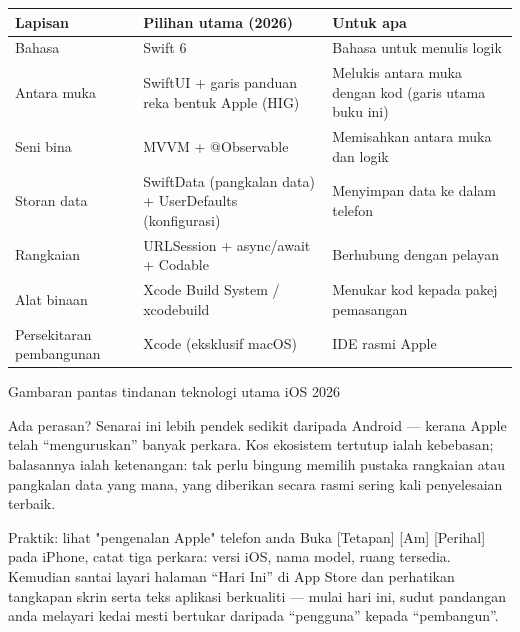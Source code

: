 
\begin{center}
\begin{tabularx}{\linewidth}{|X|X|X|}
\hline
\textbf{Lapisan} & \textbf{Pilihan utama (2026)} & \textbf{Untuk apa} \tabularnewline
\hline
Bahasa & Swift 6 & Bahasa untuk menulis logik \tabularnewline
Antara muka & SwiftUI + garis panduan reka bentuk Apple (HIG) & Melukis antara muka dengan kod (garis utama buku ini) \tabularnewline
Seni bina & MVVM + @Observable & Memisahkan antara muka dan logik \tabularnewline
Storan data & SwiftData (pangkalan data) + UserDefaults (konfigurasi) & Menyimpan data ke dalam telefon \tabularnewline
Rangkaian & URLSession + async/await + Codable & Berhubung dengan pelayan \tabularnewline
Alat binaan & Xcode Build System / xcodebuild & Menukar kod kepada pakej pemasangan \tabularnewline
Persekitaran pembangunan & Xcode (eksklusif macOS) & IDE rasmi Apple \tabularnewline
\hline
\end{tabularx}
\end{center}

\begin{center}\small\color{gray}Gambaran pantas tindanan teknologi utama iOS 2026\end{center}

Ada perasan? Senarai ini lebih pendek sedikit daripada Android — kerana Apple telah “menguruskan” banyak perkara. Kos ekosistem tertutup ialah kebebasan; balasannya ialah ketenangan: tak perlu bingung memilih pustaka rangkaian atau pangkalan data yang mana, yang diberikan secara rasmi sering kali penyelesaian terbaik.

\begin{tcbpractice}{Praktik: lihat "pengenalan Apple" telefon anda}
Buka [Tetapan] [Am] [Perihal] pada iPhone, catat tiga perkara: versi iOS, nama model, ruang tersedia. Kemudian santai layari halaman “Hari Ini” di App Store dan perhatikan tangkapan skrin serta teks aplikasi berkualiti — mulai hari ini, sudut pandangan anda melayari kedai mesti bertukar daripada “pengguna” kepada “pembangun”.

\end{tcbpractice}


